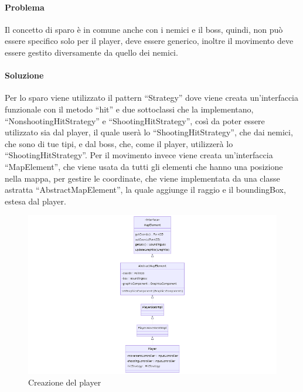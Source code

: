 \documentclass[a4paper,12pt]{report}
\begin{document}
\paragraph{Problema}
Il concetto di sparo è in comune anche con i nemici e il boss, quindi, non può essere specifico solo per il player, deve essere generico, inoltre il movimento deve essere gestito diversamente da quello dei nemici.
\paragraph{Soluzione}
Per lo sparo viene utilizzato il pattern “Strategy” dove viene creata un’interfaccia funzionale con il metodo “hit” e due sottoclassi che la implementano, “NonshootingHitStrategy” e “ShootingHitStrategy”, così da poter essere utilizzato sia dal player, il quale userà lo “ShootingHitStrategy”, che dai nemici, che sono di tue tipi, e dal boss, che, come il player, utilizzerà lo “ShootingHitStrategy”.                          Per il movimento invece viene creata un’interfaccia “MapElement”, che viene usata da tutti gli elementi che hanno una posizione nella mappa, per gestire le coordinate, che viene implementata da una classe astratta “AbstractMapElement”, la quale aggiunge il raggio e il boundingBox, estesa dal player.
\newpage
\begin{figure}
    \centering{}
    \includegraphics[scale=0.5]{diagram/player.png}
    \caption{Creazione del player}
    \label{img:player}
\end{figure}
\end{document}
